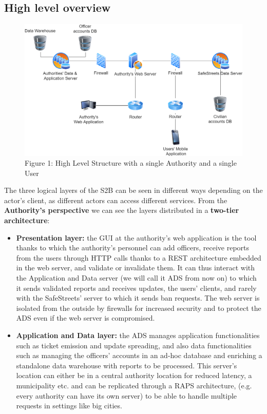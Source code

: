 \documentclass[12pt,a4paper]{article}
\begin{document}
\subsection{High level overview}
			\begin{figure}[H]
				\centering
					\begin{adjustwidth}{-25mm}{-25mm}
					        \includegraphics[width=.9\paperwidth,keepaspectratio]{Images/highlevel}
					\end{adjustwidth}
				\caption{Figure 1: High Level Structure with a single Authority and a single User}
			\end{figure}
The three logical layers of the S2B can be seen in different ways depending on the actor's client, as different actors can access different services. From the \textbf{Authority's perspective} we can see the layers distributed in a \textbf{two-tier architecture}:
\begin{itemize}
\item \textbf{Presentation layer:} the GUI at the authority's web application is the tool thanks to which the authority's personnel can add officers, receive reports  from the users through HTTP calls thanks to a REST architecture embedded in the web server, and validate or invalidate them. It can thus interact 
with the Application and Data server (we will call it ADS from now on) to which it sends validated reports and receives updates, the users' clients, and rarely with the SafeStreets' server to which it sends ban requests. The web server is isolated from the outside by firewalls for increased security and to protect the ADS even if the web server is compromised.
\item \textbf{Application and Data layer:} the ADS manages application functionalities such as ticket emission and update spreading, and also data functionalities such as managing the officers' accounts in an ad-hoc database and
enriching a standalone data warehouse with reports to be processed. This server's location can either be in a central authority location for reduced latency, a municipality etc. and can be replicated through a RAPS architecture, (e.g. every authority can have its own server)
to be able to handle multiple requests in settings like big cities. 
\end{itemize}
\end{document}
